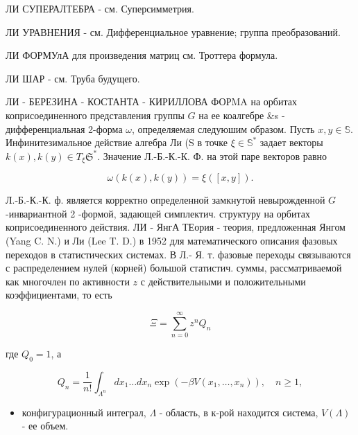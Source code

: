 \documentclass[10pt]{article}
\begin{document}
ЛИ СУПЕРАЛТЕБРА - см. Суперсимметрия.



ЛИ УРАВНЕНИЯ - см. Дифференциальное уравнение; группа преобразований.



ЛИ ФОРМУлА для произведения матриц см. Троттера формула.



ЛИ ШАР - см. Труба будущего.



ЛИ - БЕРЕЗИНА - КОСТАНТА - КИРИЛЛОВА ФОРMA на орбитах коприсоединенного представления группы $G$ на ее коалгебре \&s - дифференциальная 2-форма $\omega$, определяемая следуюшим образом. Пусть $x, y \in \mathbb{S}$. Инфинитезимальное действие алгебра Ли (S в точке $\xi \in \mathbb{S}^{*}$ задает векторы $k(x), k(y) \in T_{\xi} \mathfrak{S}^{*}$. Значение Л.-Б.-К.-К. Ф. на этой паре векторов равно



\[

\omega(k(x), k(y))=\xi([x, y]) .

\]



Л.-Б.-К.-К. ф. является корректно определенной замкнутой невырожденной $G$-инвариантной 2 -формой, задающей симплектич. структуру на орбитах коприсоединенного действия. ЛИ - ЯнгА ТЕория - теория, предложенная Янгом (Yang C. N.) и Ли (Lee T. D.) в 1952 для математического описания фазовых переходов в статистических системах. В Л.- Я. т. фазовые переходы связываются с распределением нулей (корней) большой статистич. суммы, рассматриваемой как многочлен по активности $z$ с действительными и положительными коэффициентами, то есть



\[

\Xi=\sum_{n=0}^{\infty} z^{n} Q_{n}

\]



где $Q_{0}=1$, а



\[

Q_{n}=\frac{1}{n !} \int_{\Lambda^{n}} d x_{1} \ldots d x_{n} \exp \left(-\beta V\left(x_{1}, \ldots, x_{n}\right)\right), \quad n \geqslant 1,

\]



\begin{itemize}

  \item конфигурационный интеграл, $\Lambda$ - область, в к-рой находится система, $V(\Lambda)$ - ее объем.

\end{itemize}
\end{document}
